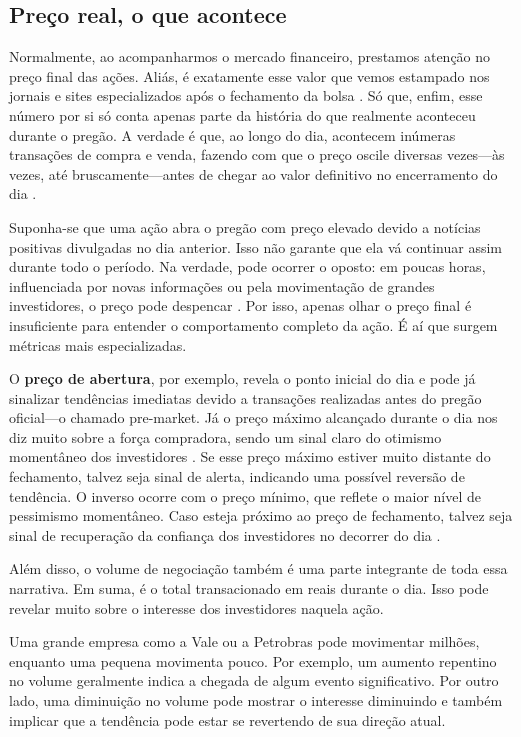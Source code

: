 \subsection{Preço real, o que acontece}

Normalmente, ao acompanharmos o mercado financeiro, prestamos atenção no preço final das ações. Aliás, é exatamente esse valor que vemos estampado nos jornais e sites especializados após o fechamento da bolsa \cite{MishkinEakins2018}. Só que, enfim, esse número por si só conta apenas parte da história do que realmente aconteceu durante o pregão. A verdade é que, ao longo do dia, acontecem inúmeras transações de compra e venda, fazendo com que o preço oscile diversas vezes—às vezes, até bruscamente—antes de chegar ao valor definitivo no encerramento do dia \cite{Murphy1999}.

Suponha-se que uma ação abra o pregão com preço elevado devido a notícias positivas divulgadas no dia anterior. Isso não garante que ela vá continuar assim durante todo o período. Na verdade, pode ocorrer o oposto: em poucas horas, influenciada por novas informações ou pela movimentação de grandes investidores, o preço pode despencar \cite{BodieKaneMarcus2021}. Por isso, apenas olhar o preço final é insuficiente para entender o comportamento completo da ação. É aí que surgem métricas mais especializadas.

O \textbf{preço de abertura}, por exemplo, revela o ponto inicial do dia e pode já sinalizar tendências imediatas devido a transações realizadas antes do pregão oficial—o chamado pre-market. Já o preço máximo alcançado durante o dia nos diz muito sobre a força compradora, sendo um sinal claro do otimismo momentâneo dos investidores \cite{Murphy1999}. Se esse preço máximo estiver muito distante do fechamento, talvez seja sinal de alerta, indicando uma possível reversão de tendência. O inverso ocorre com o preço mínimo, que reflete o maior nível de pessimismo momentâneo. Caso esteja próximo ao preço de fechamento, talvez seja sinal de recuperação da confiança dos investidores no decorrer do dia \cite{Pring2014}.

Além disso, o volume de negociação também é uma parte integrante de toda essa narrativa. Em suma, é o total transacionado em reais durante o dia. Isso pode revelar muito sobre o interesse dos investidores naquela ação.

Uma grande empresa como a Vale ou a Petrobras pode movimentar milhões, enquanto uma pequena movimenta pouco. Por exemplo, um aumento repentino no volume geralmente indica a chegada de algum evento significativo. Por outro lado, uma diminuição no volume pode mostrar o interesse diminuindo e também implicar que a tendência pode estar se revertendo de sua direção atual.

